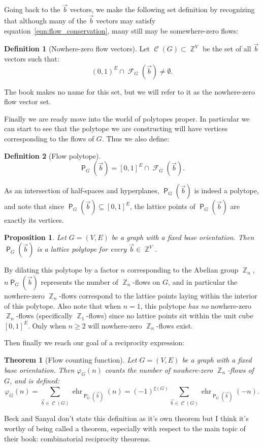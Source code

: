 \documentclass{amsart}
\DeclareMathOperator{\Z}{\mathbb{Z}}
\DeclareMathOperator{\sfP}{\mathsf{P}}
\DeclareMathOperator{\sgehr}{ehr}
\DeclareMathOperator{\calC}{\mathcal{C}}
\DeclareMathOperator{\calF}{\mathcal{F}}
\theoremstyle{plain}
\newtheorem{THM}{Theorem}
\newtheorem{prop*}{Proposition}
\theoremstyle{remark}
\theoremstyle{definition}
\newtheorem*{definition*}{Definition}
\newenvironment{thm}%
  {\begin{leftbar}\begin{THM}
}{%
  \end{THM}\end{leftbar}
}
\newenvironment{prop}%
  {\begin{leftbar}\begin{prop*}
}{%
  \end{prop*}\end{leftbar}
}
\newenvironment{definition}%
  {\begin{leftbar}\begin{definition*}
}{%
  \end{definition*}\end{leftbar}
}
\begin{document}
Going back to the $\vec b$ vectors,
we make the following set definition by recognizing that although many of the
$\vec b$ vectors may satisfy equation~\eqref{eqn:flow_conservation}, many
still may be somewhere-zero flows:
\begin{definition}[Nowhere-zero flow vectors]
  Let $\calC(G)\subset\Z^V$ be the set of all $\vec b$ vectors such that:
  \[
    {(0,1)}^E\cap\calF_G(\vec b)\ne\emptyset.
  \] 
\end{definition}
The book makes no name for this set, but we will refer to it as the nowhere-zero
flow vector set.

\hrulefill

Finally we are ready move into the world of polytopes proper.
In particular we can start to see
that the polytope we are constructing
will have vertices corresponding to the flows of $G$.
Thus we also define:
\begin{definition}[Flow polytope]
  \[
    \sfP_G(\vec b)={[0,1]}^E\cap\calF_G(\vec b).
  \]
\end{definition}
As an intersection of half-spaces and hyperplanes, $\sfP_G(\vec b)$ is indeed a
polytope, and note that since $\sfP_G(\vec b)\subseteq{[0,1]}^E$, the lattice
points of $\sfP_G(\vec b)$ are exactly its vertices.
\begin{prop}
  Let $G=(V,E)$ be a graph with a fixed base orientation.
  Then $\sfP_G(\vec b)$ is a lattice polytope for every $\vec b\in\Z^V$.
\end{prop}

By dilating this polytope by a factor $n$ corresponding to the
Abelian group $\Z_n$, $n\sfP_G(\vec b)$ represents the number of
$\Z_n$-flows on $G$, and in particular the nowhere-zero $\Z_n$-flows 
correspond to the lattice points laying within the interior of this polytope.
Also note that when $n=1$, this polytope \emph{has no}
nowhere-zero $\Z_n$-flows (specifically $\Z_1$-flows) since no lattice points
sit within the unit cube ${[0,1]}^E$. Only when $n\ge 2$ will nowhere-zero
$\Z_n$-flows exist.

Then finally we reach our goal of a reciprocity expression:
\begin{thm}[Flow counting function]
  Let $G=(V,E)$ be a graph with a fixed base orientation.
  Then $\varphi_G(n)$ counts the number of nowhere-zero $\Z_n$-flows of $G$,
  and is defined:
  \[
    \varphi_G(n)
    =\sum_{\vec b\in\calC(G)}\sgehr_{\sfP_G^\circ(\vec b)}(n)
    ={(-1)}^{\xi(G)}\sum_{\vec b\in\calC(G)}\sgehr_{\sfP_G(\vec b)}(-n).
  \]
\end{thm}
Beck and Sanyal don't state this definition as it's own theorem but I think it's
worthy of being called a theorem, especially with respect to the main topic of
their book: combinatorial reciprocity theorems.
\end{document}
